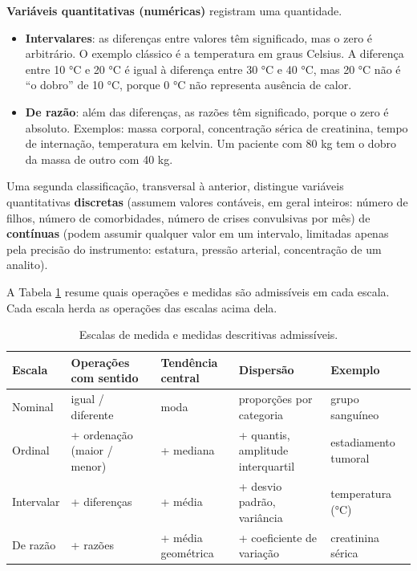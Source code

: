 \documentclass[
]{book}
\providecommand{\tightlist}{%
  \setlength{\itemsep}{0pt}\setlength{\parskip}{0pt}}
\begin{document}
\textbf{Variáveis quantitativas (numéricas)} registram uma quantidade.

\begin{itemize}
\tightlist
\item
  \textbf{Intervalares}: as diferenças entre valores têm significado, mas o zero é arbitrário. O exemplo clássico é a temperatura em graus Celsius. A diferença entre 10 °C e 20 °C é igual à diferença entre 30 °C e 40 °C, mas 20 °C não é ``o dobro'' de 10 °C, porque 0 °C não representa ausência de calor.
\item
  \textbf{De razão}: além das diferenças, as razões têm significado, porque o zero é absoluto. Exemplos: massa corporal, concentração sérica de creatinina, tempo de internação, temperatura em kelvin. Um paciente com 80 kg tem o dobro da massa de outro com 40 kg.
\end{itemize}

Uma segunda classificação, transversal à anterior, distingue variáveis quantitativas \textbf{discretas} (assumem valores contáveis, em geral inteiros: número de filhos, número de comorbidades, número de crises convulsivas por mês) de \textbf{contínuas} (podem assumir qualquer valor em um intervalo, limitadas apenas pela precisão do instrumento: estatura, pressão arterial, concentração de um analito).

A Tabela \ref{tab:desc-escalas} resume quais operações e medidas são admissíveis em cada escala. Cada escala herda as operações das escalas acima dela.

\begin{table}

\caption{\label{tab:desc-escalas}Escalas de medida e medidas descritivas admissíveis.}
\centering
\begin{tabular}[t]{>{\raggedright\arraybackslash}p{1.5cm}|>{\raggedright\arraybackslash}p{1.9cm}|>{\raggedright\arraybackslash}p{1.8cm}|>{\raggedright\arraybackslash}p{2.3cm}|>{\raggedright\arraybackslash}p{2.2cm}}
\hline
Escala & Operações com sentido & Tendência central & Dispersão & Exemplo\\
\hline
Nominal & igual / diferente & moda & proporções por categoria & grupo sanguíneo\\
\hline
Ordinal & + ordenação (maior / menor) & + mediana & + quantis, amplitude interquartil & estadiamento tumoral\\
\hline
Intervalar & + diferenças & + média & + desvio padrão, variância & temperatura (°C)\\
\hline
De razão & + razões & + média geométrica & + coeficiente de variação & creatinina sérica\\
\hline
\end{tabular}
\end{table}
\end{document}
